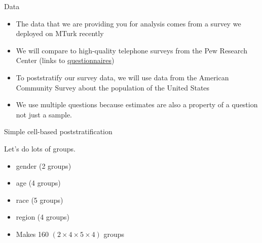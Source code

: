 \documentclass[aspectratio=169]{beamer}
\begin{document}
\begin{frame}{Data}

\begin{itemize}
\item The data that we are providing you for analysis comes from a survey we deployed on MTurk recently
\item We will compare to high-quality telephone surveys from the Pew Research Center (links to \href{https://github.com/compsocialscience/summer-institute/blob/master/2019/materials/day4-surveys/activity/2019_pew_benchmark_data.csv}{questionnaires})
\item To poststratify our survey data, we will use data from the American Community Survey about the population of the United States
\item We use multiple questions because estimates are also a property of a question not just a sample.
\end{itemize}

\end{frame}
%
%
%
%
\begin{frame}{Simple cell-based poststratification}

Let's do lots of groups.
\begin{itemize}
\item gender (2 groups)
\item age (4 groups)
\item race (5 groups)
\item region (4 groups)
\item Makes 160 $(2 \times 4 \times 5 \times 4)$ groups
\end{itemize}

\end{frame}
\end{document}
